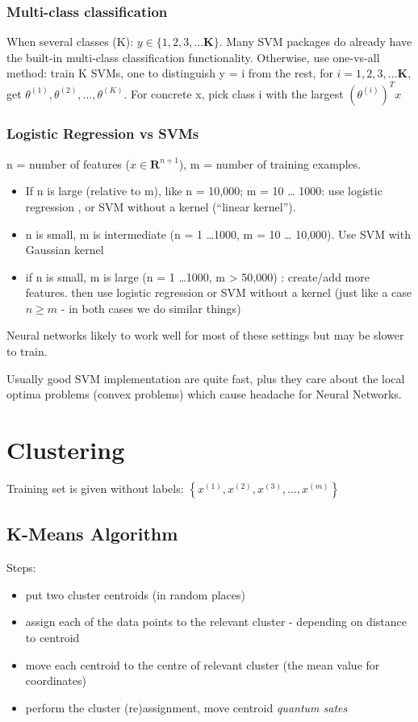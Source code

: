 \documentclass{scrartcl}
\begin{document}
\subsubsection{Multi-class classification}
\label{sec:12-6-1}
When several classes (K): $y \in \{1, 2, 3, \dots \mathbf{K} \}$. Many
SVM packages do already have the built-in multi-class classification
functionality. Otherwise, use one-vs-all method: train K SVMs, one to
distinguish y = i from the rest, for $i = 1, 2, 3, \dots \mathbf{K}$,
get $\theta^{(1)}, \theta^{(2)}, \dots , \theta^{(K)}$. For concrete
x, pick class i with the largest $(\theta^{(i)})^T x$

\subsubsection{Logistic Regression vs SVMs}
n = number of features ($x \in \mathbf{R}^{n+1}$), m = number of
training examples.
\begin{itemize}
\item If n is large (relative to m), like n = 10,000; m = 10 \ldots
  1000: use logistic regression , or SVM without a kernel (``linear
  kernel'').
\item n is small, m is intermediate (n = 1 \ldots 1000, m = 10 \ldots
  10,000). Use SVM with Gaussian kernel
\item if n is small, m is large (n = 1 \ldots 1000, m > 50,000) :
  create/add more features. then use logistic regression or SVM
  without a kernel (just like a case $n \geq m$ - in both cases we do
  similar things)
\end{itemize}

Neural networks likely to work well for most of these settings but may
be slower to train.

Usually good SVM implementation are quite fast, plus they care about
the local optima problems (convex problems) which cause headache for
Neural Networks.

\section{Clustering}
\label{sec:13}

Training set is given without labels: $\left\{ x^{(1)}, x^{(2)},
  x^{(3)}, \dots , x^{(m)} \right\}$

\subsection{K-Means Algorithm}
\label{sec:13-2}
Steps:
\begin{itemize}
\item put two cluster centroids (in random places)
\item assign each of the data points to the relevant cluster -
  depending on distance to centroid
\item move each centroid to the centre of relevant cluster (the mean
  value for coordinates)
\item perform the cluster (re)assignment, move centroid {\it quantum
    sates}
\end{itemize}
\end{document}
